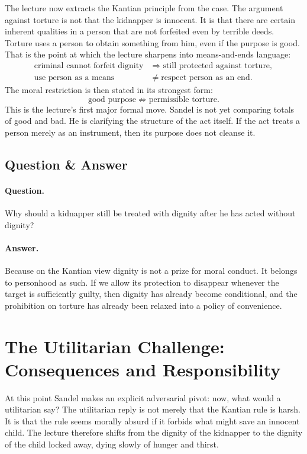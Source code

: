 The lecture now extracts the Kantian principle from the case. The argument against torture is not that the kidnapper is innocent. It is that there are certain inherent qualities in a person that are not forfeited even by terrible deeds. Torture uses a person to obtain something from him, even if the purpose is good. That is the point at which the lecture sharpens into means-and-ends language:
\begin{align}
\text{criminal cannot forfeit dignity}
&\Longrightarrow
\text{still protected against torture},\\
\text{use person as a means}
&\neq
\text{respect person as an end}.
\end{align}
The moral restriction is then stated in its strongest form:
\begin{equation}
\text{good purpose}
\not\Rightarrow
\text{permissible torture}.
\end{equation}
This is the lecture's first major formal move. Sandel is not yet comparing totals of good and bad. He is clarifying the structure of the act itself. If the act treats a person merely as an instrument, then its purpose does not cleanse it.

\subsection{Question \& Answer}

\paragraph{Question.} Why should a kidnapper still be treated with dignity after he has acted without dignity?

\paragraph{Answer.} Because on the Kantian view dignity is not a prize for moral conduct. It belongs to personhood as such. If we allow its protection to disappear whenever the target is sufficiently guilty, then dignity has already become conditional, and the prohibition on torture has already been relaxed into a policy of convenience.

\section{The Utilitarian Challenge: Consequences and Responsibility}

At this point Sandel makes an explicit adversarial pivot: now, what would a utilitarian say? The utilitarian reply is not merely that the Kantian rule is harsh. It is that the rule seems morally absurd if it forbids what might save an innocent child. The lecture therefore shifts from the dignity of the kidnapper to the dignity of the child locked away, dying slowly of hunger and thirst.

